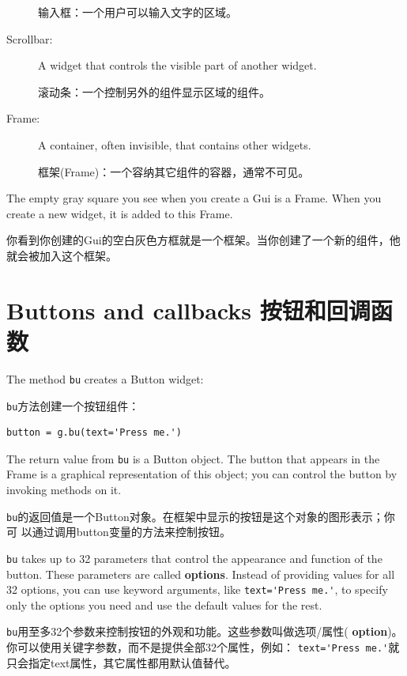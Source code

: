 \documentclass[10pt]{book}
\begin{document}
\begin{CJK}{UTF8}{gbsn}
\begin{description}
    输入框：一个用户可以输入文字的区域。

\item[Scrollbar:] A widget that controls the visible part of another
widget.

滚动条：一个控制另外的组件显示区域的组件。

\item[Frame:] A container, often invisible, that contains other
widgets.

框架(Frame)：一个容纳其它组件的容器，通常不可见。

\end{description}

The empty gray square you see when you create a Gui is
a Frame.  When you create a new widget, it is added to this Frame.

你看到你创建的Gui的空白灰色方框就是一个框架。当你创建了一个新的组件，他就会被加入这个框架。

\section{Buttons and callbacks  按钮和回调函数}

The method {\tt bu} creates a Button widget:

{\tt bu}方法创建一个按钮组件：

\begin{verbatim}
button = g.bu(text='Press me.')
\end{verbatim}
%
The return value from {\tt bu} is a Button object.  The button
that appears in the Frame is a graphical representation of this
object; you can control the button by invoking methods on it.

{\tt bu}的返回值是一个Button对象。在框架中显示的按钮是这个对象的图形表示；你可
以通过调用button变量的方法来控制按钮。

{\tt bu} takes up to 32 parameters that control the appearance
and function of the button.  These parameters are called
{\bf options}.  Instead of providing values for all 32 options,
you can use keyword arguments, like \verb"text='Press me.'",
to specify only the options you need and use the default
values for the rest.

{\tt bu}用至多32个参数来控制按钮的外观和功能。这些参数叫做选项/属性({\bf
option})。你可以使用关键字参数，而不是提供全部32个属性，例如：
\verb"text='Press me.'"就只会指定text属性，其它属性都用默认值替代。


\end{CJK}
\end{document}
